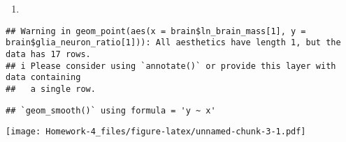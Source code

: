 \documentclass[
]{article}
\newenvironment{Shaded}{\begin{snugshade}}{\end{snugshade}}
\newcommand{\AttributeTok}[1]{\textcolor[rgb]{0.13,0.29,0.53}{#1}}
\newcommand{\ConstantTok}[1]{\textcolor[rgb]{0.56,0.35,0.01}{#1}}
\newcommand{\DecValTok}[1]{\textcolor[rgb]{0.00,0.00,0.81}{#1}}
\newcommand{\FunctionTok}[1]{\textcolor[rgb]{0.13,0.29,0.53}{\textbf{#1}}}
\newcommand{\NormalTok}[1]{#1}
\newcommand{\OtherTok}[1]{\textcolor[rgb]{0.56,0.35,0.01}{#1}}
\newcommand{\SpecialCharTok}[1]{\textcolor[rgb]{0.81,0.36,0.00}{\textbf{#1}}}
\newcommand{\StringTok}[1]{\textcolor[rgb]{0.31,0.60,0.02}{#1}}
\providecommand{\tightlist}{%
  \setlength{\itemsep}{0pt}\setlength{\parskip}{0pt}}
\begin{document}
\begin{enumerate}
\def\labelenumi{\alph{enumi})}
\tightlist
\item
\end{enumerate}

\begin{Shaded}
\end{Shaded}

\begin{verbatim}
## Warning in geom_point(aes(x = brain$ln_brain_mass[1], y = brain$glia_neuron_ratio[1])): All aesthetics have length 1, but the data has 17 rows.
## i Please consider using `annotate()` or provide this layer with data containing
##   a single row.
\end{verbatim}

\begin{verbatim}
## `geom_smooth()` using formula = 'y ~ x'
\end{verbatim}

\texttt{[image: Homework-4\_files/figure-latex/unnamed-chunk-3-1.pdf]}
\end{document}
